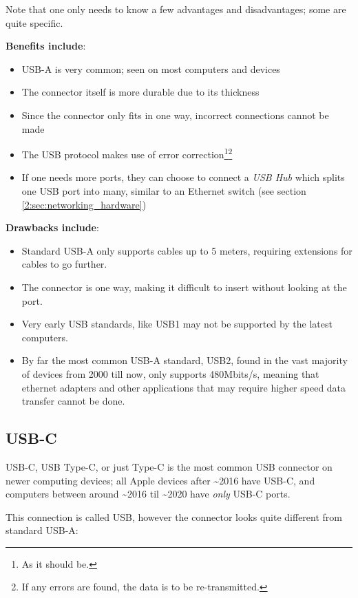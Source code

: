 \documentclass[../main.tex]{subfiles}
\begin{document}
Note that one only needs to know a few advantages and disadvantages; some are quite specific.

\textbf{Benefits include}:
\begin{itemize}
    \item USB-A is very common; seen on most computers and devices
    \item The connector itself is more durable due to its thickness
    \item Since the connector only fits in one way, incorrect connections cannot be made
    \item The USB protocol makes use of error correction\footnote{As it should be.}\footnote{If any errors are found, the data is to be re-transmitted.}
    \item If one needs more ports, they can choose to connect a \emph{USB Hub} which splits one USB port into many, similar to an Ethernet switch (see section \ref{2:sec:networking_hardware})
\end{itemize}

\textbf{Drawbacks include}:
\begin{itemize}
    \item Standard USB-A only supports cables up to 5 meters, requiring extensions for cables to go further.
    \item The connector is one way, making it difficult to insert without looking at the port.
    \item Very early USB standards, like USB1 may not be supported by the latest computers.
    \item By far the most common USB-A standard, USB2, found in the vast majority of devices from 2000 till now, only supports 480Mbits/s, meaning that ethernet adapters and other applications that may require higher speed data transfer cannot be done.
\end{itemize}

\subsection{USB-C}

USB-C, USB Type-C, or just Type-C is the most common USB connector on newer computing devices; all Apple devices after \textasciitilde 2016 have USB-C, and computers between around \textasciitilde 2016 til \textasciitilde 2020 have \emph{only} USB-C ports.

This connection is called USB, however the connector looks quite different from standard USB-A:
\end{document}
